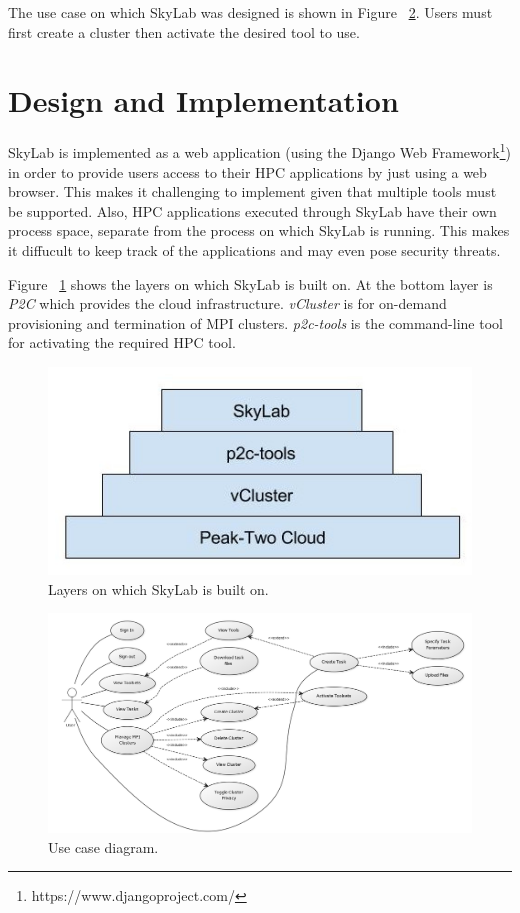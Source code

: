 The use case on which SkyLab was designed is shown in Figure ~\ref{fig:usecase}. Users must first create a cluster then activate the desired tool to use.
      
\section{Design and Implementation}

SkyLab is implemented as a web application (using the Django Web Framework\footnote{https://www.djangoproject.com/}) in order to provide users access to their HPC applications by just using a web browser. This makes it challenging to implement given that multiple tools must be supported. Also, HPC applications executed through SkyLab have their own process space, separate from the process on which SkyLab is running. This makes it diffucult to keep track of the applications and may even pose security threats. 

Figure ~\ref{fig:sysarch} shows the layers on which SkyLab is built on. At the bottom layer is \textit{P2C} which provides the cloud infrastructure. \textit{vCluster} is for on-demand provisioning and termination of MPI clusters. \textit{p2c-tools} is the command-line tool for activating the required HPC tool.

	\begin{figure}[h]			
		\includegraphics[scale=0.30]{./images/skylab_layers.jpg}			
		\caption{\label{fig:sysarch}Layers on which SkyLab is built on.}	
	\end{figure}	


    \begin{figure}[ht]
      \centering
      \includegraphics[scale=0.36]{./images/use_case_large.png}
      \caption{\label{fig:usecase}Use case diagram.}
    \end{figure}

